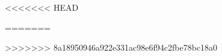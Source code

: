 \documentclass[12pt]{report} %
\begin{document}










\tableofcontents
\clearpage










\setcounter{romanPagenumber}{\value{page}}
\setcounter{page}{1}







<<<<<<< HEAD



=======
%

%
>>>>>>> 8a18950946a922e331ac98e6f94c2fbe78bc18a0




\end{document}
